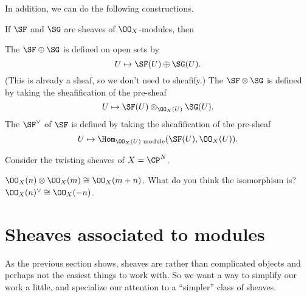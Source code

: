 In addition, we can do the following constructions.
\begin{definition}
	If $\SF$ and $\SG$ are sheaves of $\OO_X$-modules, then
	\begin{enumerate}[(a)]
		\ii The  $\SF \oplus \SG$ is defined
		on open sets by \[ U \mapsto \SF(U) \oplus \SG(U). \]
		(This is already a sheaf, so we don't need to sheafify.)
		\ii The  $\SF \otimes \SG$ is defined
		by taking the sheafification of the pre-sheaf
		\[ U \mapsto \SF(U) \otimes_{\OO_X(U)} \SG(U). \]
		\ii The  $\SF^\vee$ of $\SF$ is defined
		by taking the sheafification of the pre-sheaf
		\[ U \mapsto \Hom_{\OO_X(U) \text{ module}} (\SF(U), \OO_X(U)). \]
	\end{enumerate}
\end{definition}
\begin{example}
	Consider the twisting sheaves of $X = \CP^N$.
	\begin{enumerate}[(a)]
		\ii $\OO_X(n) \otimes \OO_X(m) \cong \OO_X(m+n)$.
		What do you think the isomorphism is?
		\ii $\OO_X(n)^\vee \cong \OO_X(-n)$.
	\end{enumerate}
\end{example}

\section{Sheaves associated to modules}
As the previous section shows, sheaves are rather than complicated objects
and perhaps not the easiest things to work with.
So we want a way to simplify our work a little,
and specialize our attention to a ``simpler'' class of sheaves.


